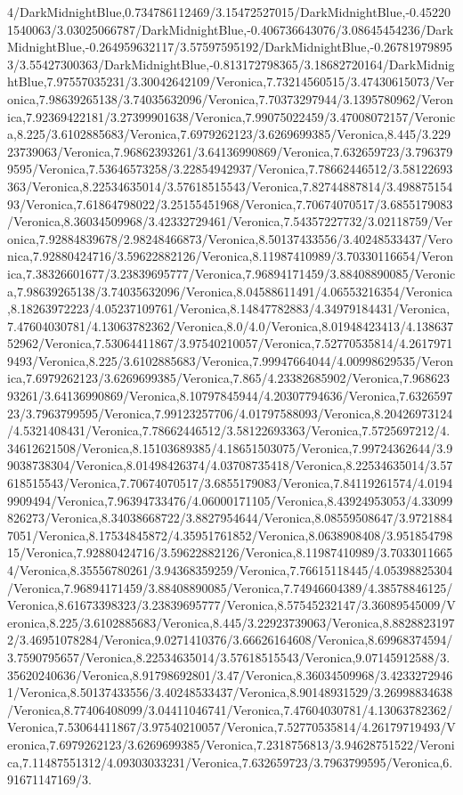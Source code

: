 {\begin{tikzternal}
4/DarkMidnightBlue,0.734786112469/3.15472527015/DarkMidnightBlue,-0.452201540063/3.03025066787/DarkMidnightBlue,-0.406736643076/3.08645454236/DarkMidnightBlue,-0.264959632117/3.57597595192/DarkMidnightBlue,-0.267819798953/3.55427300363/DarkMidnightBlue,-0.813172798365/3.18682720164/DarkMidnightBlue,7.97557035231/3.30042642109/Veronica,7.73214560515/3.47430615073/Veronica,7.98639265138/3.74035632096/Veronica,7.70373297944/3.1395780962/Veronica,7.92369422181/3.27399901638/Veronica,7.99075022459/3.47008072157/Veronica,8.225/3.6102885683/Veronica,7.6979262123/3.6269699385/Veronica,8.445/3.22923739063/Veronica,7.96862393261/3.64136990869/Veronica,7.632659723/3.7963799595/Veronica,7.53646573258/3.22854942937/Veronica,7.78662446512/3.58122693363/Veronica,8.22534635014/3.57618515543/Veronica,7.82744887814/3.49887515493/Veronica,7.61864798022/3.25155451968/Veronica,7.70674070517/3.6855179083/Veronica,8.36034509968/3.42332729461/Veronica,7.54357227732/3.02118759/Veronica,7.92884839678/2.98248466873/Veronica,8.50137433556/3.40248533437/Veronica,7.92880424716/3.59622882126/Veronica,8.11987410989/3.70330116654/Veronica,7.38326601677/3.23839695777/Veronica,7.96894171459/3.88408890085/Veronica,7.98639265138/3.74035632096/Veronica,8.04588611491/4.06553216354/Veronica,8.18263972223/4.05237109761/Veronica,8.14847782883/4.34979184431/Veronica,7.47604030781/4.13063782362/Veronica,8.0/4.0/Veronica,8.01948423413/4.13863752962/Veronica,7.53064411867/3.97540210057/Veronica,7.52770535814/4.26179719493/Veronica,8.225/3.6102885683/Veronica,7.99947664044/4.00998629535/Veronica,7.6979262123/3.6269699385/Veronica,7.865/4.23382685902/Veronica,7.96862393261/3.64136990869/Veronica,8.10797845944/4.20307794636/Veronica,7.632659723/3.7963799595/Veronica,7.99123257706/4.01797588093/Veronica,8.20426973124/4.5321408431/Veronica,7.78662446512/3.58122693363/Veronica,7.5725697212/4.34612621508/Veronica,8.15103689385/4.18651503075/Veronica,7.99724362644/3.99038738304/Veronica,8.01498426374/4.03708735418/Veronica,8.22534635014/3.57618515543/Veronica,7.70674070517/3.6855179083/Veronica,7.84119261574/4.01949909494/Veronica,7.96394733476/4.06000171105/Veronica,8.43924953053/4.33099826273/Veronica,8.34038668722/3.8827954644/Veronica,8.08559508647/3.97218847051/Veronica,8.17534845872/4.35951761852/Veronica,8.0638908408/3.95185479815/Veronica,7.92880424716/3.59622882126/Veronica,8.11987410989/3.70330116654/Veronica,8.35556780261/3.94368359259/Veronica,7.76615118445/4.05398825304/Veronica,7.96894171459/3.88408890085/Veronica,7.74946604389/4.38578846125/Veronica,8.61673398323/3.23839695777/Veronica,8.57545232147/3.36089545009/Veronica,8.225/3.6102885683/Veronica,8.445/3.22923739063/Veronica,8.88288231972/3.46951078284/Veronica,9.0271410376/3.66626164608/Veronica,8.69968374594/3.7590795657/Veronica,8.22534635014/3.57618515543/Veronica,9.07145912588/3.35620240636/Veronica,8.91798692801/3.47/Veronica,8.36034509968/3.42332729461/Veronica,8.50137433556/3.40248533437/Veronica,8.90148931529/3.26998834638/Veronica,8.77406408099/3.04411046741/Veronica,7.47604030781/4.13063782362/Veronica,7.53064411867/3.97540210057/Veronica,7.52770535814/4.26179719493/Veronica,7.6979262123/3.6269699385/Veronica,7.2318756813/3.94628751522/Veronica,7.11487551312/4.09303033231/Veronica,7.632659723/3.7963799595/Veronica,6.91671147169/3.
\end{tikzternal}}
